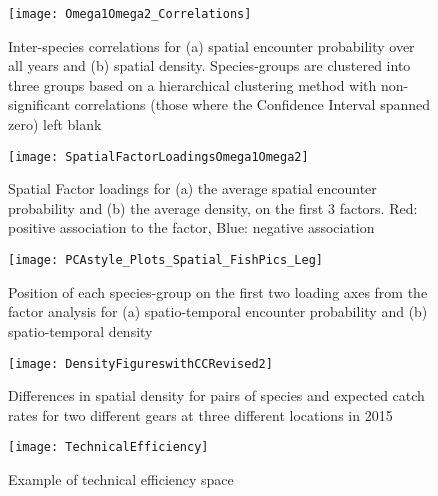 \documentclass{nature}
\begin{document}

\begin{figure}
\begin{center}
	\texttt{[image: Omega1Omega2\_Correlations]}
	\label{fig:1}
	\caption{Inter-species correlations for (a) spatial encounter
		probability over all years and (b) spatial density.
		Species-groups are clustered into three groups based on a
		hierarchical clustering method with non-significant
		correlations (those where the Confidence Interval spanned zero)
		left blank}
\end{center}
\end{figure}

\begin{figure}
\begin{center}
	\texttt{[image: SpatialFactorLoadingsOmega1Omega2]}
	\label{fig:2}
	\caption{Spatial Factor loadings for (a) the average spatial encounter
		probability and (b) the average density,  on the first 3
		factors. Red: positive association to the factor, Blue:
		negative association}
\end{center}
\end{figure}

\begin{figure}
\begin{center}
	\texttt{[image: PCAstyle\_Plots\_Spatial\_FishPics\_Leg]}
	\label{fig:3}
	\caption{Position of each species-group on the first two loading axes from the
	factor analysis for (a) spatio-temporal encounter probability and (b)
	spatio-temporal density}
\end{center}
\end{figure}

\begin{figure}
\begin{center}
	\texttt{[image: DensityFigureswithCCRevised2]}
	\label{fig:4}
	\caption{Differences in spatial density for pairs of species and
		expected catch rates for two different gears at three different
	locations in 2015}
\end{center}
\end{figure}

\begin{figure}
\begin{center}
	\texttt{[image: TechnicalEfficiency]}
	\label{fig:5}
	\caption{Example of technical efficiency space}
\end{center}
\end{figure}
\end{document}
